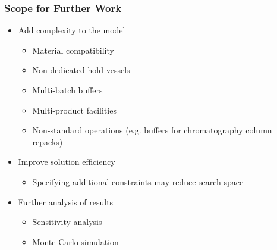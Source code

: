 \documentclass{beamer}
\begin{document}
\begin{frame}
    \frametitle{Scope for Further Work}
    \begin{itemize}
        \item Add complexity to the model
        \begin{itemize}
            \item Material compatibility
            \item Non-dedicated hold vessels
            \item Multi-batch buffers
            \item Multi-product facilities
            \item Non-standard operations (e.g. buffers for chromatography
                column repacks)
        \end{itemize}
        \item Improve solution efficiency
        \begin{itemize}
            \item Specifying additional constraints may reduce search space
        \end{itemize}
        \item Further analysis of results
        \begin{itemize}
            \item Sensitivity analysis
            \item Monte-Carlo simulation
        \end{itemize}
    \end{itemize}
\end{frame}
\end{document}

